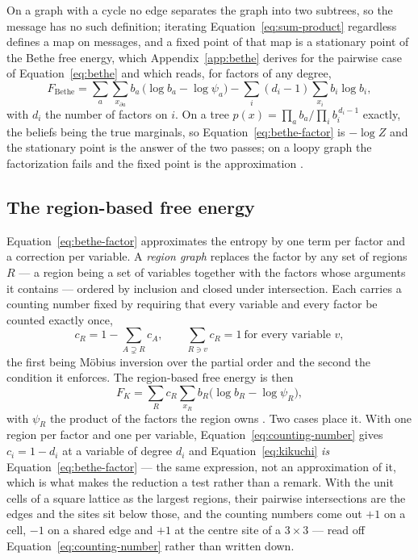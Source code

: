 \documentclass[11pt,a4paper]{article}
\begin{document}
On a graph with a cycle no edge separates the graph into two subtrees, so
the message has no such definition; iterating Equation~\ref{eq:sum-product}
regardless defines a map on messages, and a fixed point of that map is a
stationary point of the Bethe free energy, which Appendix~\ref{app:bethe}
derives for the pairwise case of Equation~\ref{eq:bethe} and which reads, for
factors of any degree,
\begin{equation}
  F_{\mathrm{Bethe}}
    = \sum_a \sum_{x_{\partial a}} b_a\,\big(\log b_a - \log \psi_a\big)
    - \sum_i (d_i - 1) \sum_{x_i} b_i \log b_i,
  \label{eq:bethe-factor}
\end{equation}
with $d_i$ the number of factors on $i$. On a tree $p(x) = \prod_a b_a /
\prod_i b_i^{\,d_i - 1}$ exactly, the beliefs being the true marginals, so
Equation~\ref{eq:bethe-factor} is $-\log Z$ and the stationary point is the
answer of the two passes; on a loopy graph the factorization fails and the
fixed point is the approximation
\citep{yedidia2005, mezard2009}.

\subsection{The region-based free energy}
\label{app:kikuchi}
Equation~\ref{eq:bethe-factor} approximates the entropy by one term per factor
and a correction per variable. A \emph{region graph} replaces the factor by any
set of regions $R$ --- a region being a set of variables together with the
factors whose arguments it contains --- ordered by inclusion and closed under
intersection. Each carries a counting number fixed by requiring that every
variable and every factor be counted exactly once,
\begin{equation}
  c_R = 1 - \sum_{A \supsetneq R} c_A,
  \qquad \sum_{R \ni v} c_R = 1 \ \text{for every variable } v,
  \label{eq:counting-number}
\end{equation}
the first being M\"obius inversion over the partial order and the second the
condition it enforces. The region-based free energy is then
\begin{equation}
  F_{K} = \sum_R c_R \sum_{x_R} b_R
          \big(\log b_R - \log \psi_R\big),
  \label{eq:kikuchi}
\end{equation}
with $\psi_R$ the product of the factors the region owns
\citep{yedidia2005, mezard2009}. Two cases place it. With one region per
factor and one per variable, Equation~\ref{eq:counting-number} gives
$c_i = 1 - d_i$ at a variable of degree $d_i$ and
Equation~\ref{eq:kikuchi} \emph{is} Equation~\ref{eq:bethe-factor} --- the
same expression, not an approximation of it, which is what makes the
reduction a test rather than a remark. With the unit cells of a square
lattice as the largest regions, their pairwise intersections are the edges
and the sites sit below those, and the counting numbers come out
$+1$ on a cell, $-1$ on a shared edge and $+1$ at the centre site of a
$3 \times 3$ --- read off Equation~\ref{eq:counting-number} rather than
written down.
\end{document}
